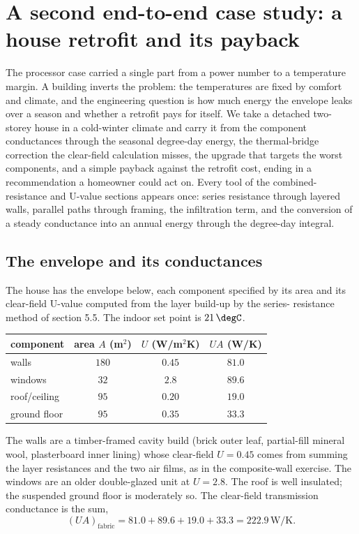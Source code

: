 \section{A second end-to-end case study: a house retrofit and its
payback}

The processor case carried a single part from a power number to a
temperature margin. A building inverts the problem: the temperatures are
fixed by comfort and climate, and the engineering question is how much
energy the envelope leaks over a season and whether a retrofit pays for
itself. We take a detached two-storey house in a cold-winter climate and
carry it from the component conductances through the seasonal degree-day
energy, the thermal-bridge correction the clear-field calculation misses,
the upgrade that targets the worst components, and a simple payback against
the retrofit cost, ending in a recommendation a homeowner could act on.
Every tool of the combined-resistance and U-value sections appears once:
series resistance through layered walls, parallel paths through framing,
the infiltration term, and the conversion of a steady conductance into an
annual energy through the degree-day integral.

\subsection{The envelope and its conductances}

The house has the envelope below, each component specified by its area and
its clear-field U-value computed from the layer build-up by the series-
resistance method of section 5.5. The indoor set point is $21\,\degC$.

\begin{center}
\begin{tabular}{lccc}
\toprule
component & area $A$ (m$^2$) & $U$ (W/m$^2$K) & $UA$ (W/K) \\
\midrule
walls & $180$ & $0.45$ & $81.0$ \\
windows & $32$ & $2.8$ & $89.6$ \\
roof/ceiling & $95$ & $0.20$ & $19.0$ \\
ground floor & $95$ & $0.35$ & $33.3$ \\
\bottomrule
\end{tabular}
\end{center}

The walls are a timber-framed cavity build (brick outer leaf, partial-fill
mineral wool, plasterboard inner lining) whose clear-field $U = 0.45$ comes
from summing the layer resistances and the two air films, as in the
composite-wall exercise. The windows are an older double-glazed unit at
$U = 2.8$. The roof is well insulated; the suspended ground floor is
moderately so. The clear-field transmission conductance is the sum,
\[
(UA)_{\text{fabric}} = 81.0 + 89.6 + 19.0 + 33.3 = 222.9\,\text{W}/\si{
\kelvin}.
\]

